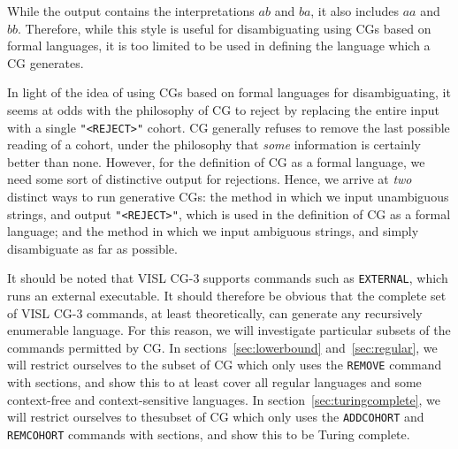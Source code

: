 \documentclass[11pt]{article}
\def\t#1{\texttt{#1}}
\begin{document}
While the output contains the interpretations $ab$ and $ba$, it also includes
$aa$ and $bb$. Therefore, while this style is useful for disambiguating using
CGs based on formal languages, it is too limited to be used in defining the
language which a CG generates.

In light of the idea of using CGs based on formal languages for disambiguating,
it seems at odds with the philosophy of CG to reject by replacing the entire
input with a single \t{"<REJECT>"} cohort. CG generally refuses to remove the
last possible reading of a cohort, under the philosophy that \emph{some}
information is certainly better than none.
However, for the definition of CG as a formal language, we need some sort of
distinctive output for rejections. Hence, we arrive at \emph{two} distinct ways
to run generative CGs: the method in which we input unambiguous strings, and
output \t{"<REJECT>"}, which is used in the definition of CG as a formal
language; and the method in which we input ambiguous strings, and simply
disambiguate as far as possible. 

It should be noted that VISL CG-3 \cite{bick2015,vislcg3} supports commands 
such as \t{EXTERNAL}, which runs an external executable. It should therefore 
be obvious that the complete set of VISL CG-3 commands, at least theoretically,
can generate any recursively enumerable language. For this reason, we will
investigate particular subsets of the commands permitted by CG.
In sections~\ref{sec:lowerbound} and~\ref{sec:regular}, we will restrict
ourselves to the subset of CG which only uses the \t{REMOVE} command with
sections, and show this to at least cover all regular languages and some
context-free and context-sensitive languages.
In section~\ref{sec:turingcomplete}, we will restrict ourselves to thesubset of
CG which only uses the \t{ADDCOHORT} and \t{REMCOHORT} commands with sections,
and show this to be Turing complete.
\end{document}
